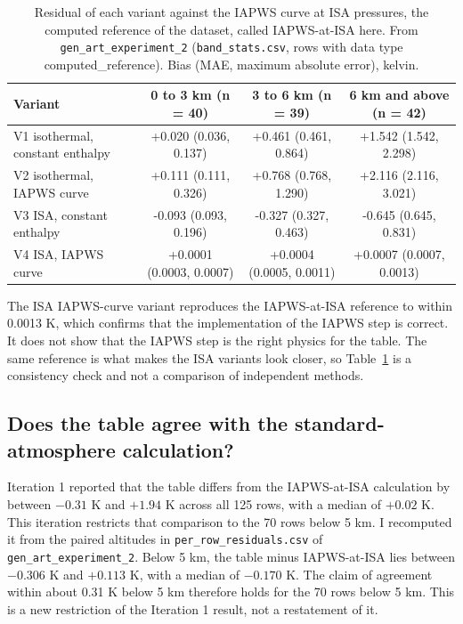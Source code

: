 \documentclass[11pt,letterpaper]{article}
\begin{document}
\begin{table}[!htbp]
\centering\footnotesize
\caption{Residual of each variant against the IAPWS curve at ISA pressures, the computed reference of the dataset, called IAPWS-at-ISA here. From \texttt{gen\_art\_experiment\_2} (\texttt{band\_stats.csv}, rows with data type computed\_reference). Bias (MAE, maximum absolute error), kelvin.}\label{tab:t8}
\begin{tabular}{p{4.6cm}ccc}
\toprule
Variant & 0 to 3 km (n = 40) & 3 to 6 km (n = 39) & 6 km and above (n = 42) \\
\midrule
V1 isothermal, constant enthalpy & +0.020 (0.036, 0.137) & +0.461 (0.461, 0.864) & +1.542 (1.542, 2.298) \\
V2 isothermal, IAPWS curve & +0.111 (0.111, 0.326) & +0.768 (0.768, 1.290) & +2.116 (2.116, 3.021) \\
V3 ISA, constant enthalpy & -0.093 (0.093, 0.196) & -0.327 (0.327, 0.463) & -0.645 (0.645, 0.831) \\
V4 ISA, IAPWS curve & +0.0001 (0.0003, 0.0007) & +0.0004 (0.0005, 0.0011) & +0.0007 (0.0007, 0.0013) \\
\bottomrule
\end{tabular}
\end{table}

The ISA IAPWS-curve variant reproduces the IAPWS-at-ISA reference to within 0.0013 K, which confirms that the implementation of the IAPWS step is correct. It does not show that the IAPWS step is the right physics for the table. The same reference is what makes the ISA variants look closer, so Table~\ref{tab:t8} is a consistency check and not a comparison of independent methods.

\subsection{Does the table agree with the standard-atmosphere calculation?}

Iteration 1 reported that the table differs from the IAPWS-at-ISA calculation by between $-0.31$ K and $+1.94$ K across all 125 rows, with a median of $+0.02$ K. This iteration restricts that comparison to the 70 rows below 5 km. I recomputed it from the paired altitudes in \texttt{per\_row\_residuals.csv} of \texttt{gen\_art\_experiment\_2}. Below 5 km, the table minus IAPWS-at-ISA lies between $-0.306$ K and $+0.113$ K, with a median of $-0.170$ K. The claim of agreement within about 0.31 K below 5 km therefore holds for the 70 rows below 5 km. This is a new restriction of the Iteration 1 result, not a restatement of it.
\end{document}
